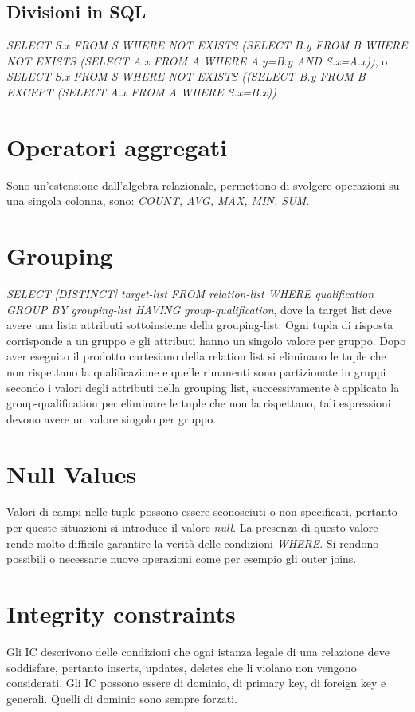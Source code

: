 \subsection{Divisioni in SQL}
\emph{SELECT S.x FROM S WHERE NOT EXISTS (SELECT B.y FROM B WHERE NOT EXISTS (SELECT A.x FROM A WHERE A.y=B.y AND S.x=A.x))}, o 
\emph{SELECT S.x FROM S WHERE NOT EXISTS ((SELECT B.y FROM B EXCEPT (SELECT A.x FROM A WHERE S.x=B.x))}
\section{Operatori aggregati}
Sono un'estensione dall'algebra relazionale, permettono di svolgere operazioni su una singola colonna, sono: \emph{COUNT, AVG, MAX, MIN, SUM}.
\section{Grouping}
\emph{SELECT [DISTINCT] target-list FROM relation-list WHERE qualification GROUP BY grouping-list HAVING group-qualification}, dove la target list deve 
avere una lista attributi sottoinsieme della grouping-list. Ogni tupla di risposta corrisponde a un gruppo e gli attributi hanno un singolo valore per 
gruppo. Dopo aver eseguito il prodotto cartesiano della relation list si eliminano le tuple che non rispettano la qualificazione e quelle rimanenti sono
partizionate in gruppi secondo i valori degli attributi nella grouping list, successivamente \`e applicata la group-qualification per eliminare le tuple
che non la rispettano, tali espressioni devono avere un valore singolo per gruppo.
\section{Null Values}
Valori di campi nelle tuple possono essere sconosciuti o non specificati, pertanto per queste situazioni si introduce il valore \emph{null}. La presenza di 
questo valore rende molto difficile garantire la verit\`a delle condizioni \emph{WHERE}. Si rendono possibili o necessarie nuove operazioni come per esempio
gli outer joins. 
\section{Integrity constraints}
Gli IC descrivono delle condizioni che ogni istanza legale di una relazione deve soddisfare, pertanto inserts, updates, deletes che li violano non vengono 
considerati. Gli IC possono essere di dominio, di primary key, di foreign key e generali. Quelli di dominio sono sempre forzati.
